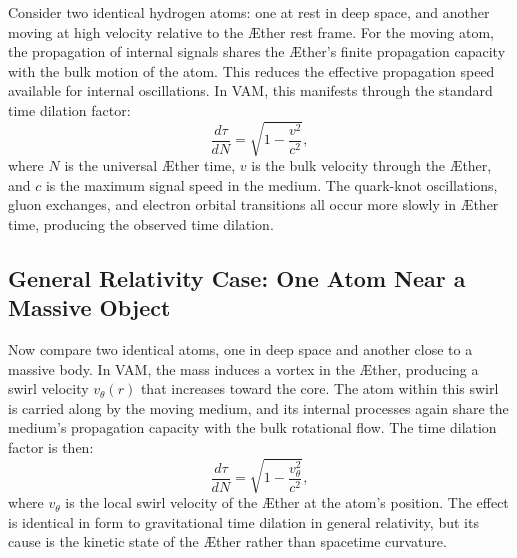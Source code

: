 \documentclass[11pt]{article}
\begin{document}
Consider two identical hydrogen atoms: one at rest in deep space, and another moving at high velocity relative to the Æther rest frame. For the moving atom, the propagation of internal signals shares the Æther's finite propagation capacity with the bulk motion of the atom. This reduces the effective propagation speed available for internal oscillations. In VAM, this manifests through the standard time dilation factor:
\begin{equation}
    \frac{d\tau}{dN} = \sqrt{1 - \frac{v^2}{c^2}},
\end{equation}
where $N$ is the universal Æther time, $v$ is the bulk velocity through the Æther, and $c$ is the maximum signal speed in the medium. The quark-knot oscillations, gluon exchanges, and electron orbital transitions all occur more slowly in Æther time, producing the observed time dilation.

\subsection{General Relativity Case: One Atom Near a Massive Object}

Now compare two identical atoms, one in deep space and another close to a massive body. In VAM, the mass induces a vortex in the Æther, producing a swirl velocity $v_\theta(r)$ that increases toward the core. The atom within this swirl is carried along by the moving medium, and its internal processes again share the medium's propagation capacity with the bulk rotational flow. The time dilation factor is then:
\begin{equation}
    \frac{d\tau}{dN} = \sqrt{1 - \frac{v_\theta^2}{c^2}},
\end{equation}
where $v_\theta$ is the local swirl velocity of the Æther at the atom's position. The effect is identical in form to gravitational time dilation in general relativity, but its cause is the kinetic state of the Æther rather than spacetime curvature.
\end{document}
